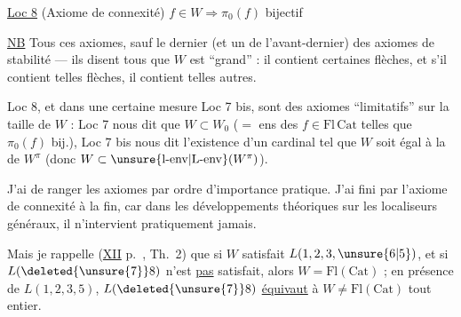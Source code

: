 

\uline{Loc 8} (Axiome de connexité) $f\in W\Rightarrow\pi_0(f)$ bijectif

\uline{NB} Tous ces axiomes, sauf le dernier (et un  de l'avant-dernier)  des axiomes de stabilité --- ils disent tous que $W$ est ``grand'' : il contient certaines flèches, et s'il contient telles flèches, il contient telles autres.

Loc 8, et dans une certaine mesure Loc 7 bis, sont des axiomes ``limitatifs'' sur la taille de $W$ : Loc 7 nous dit que $W\subset W_0$ ($=$ ens des $f\in\mathrm{Fl}\,\mathrm{Cat}$ telles que $\pi_0(f)$ bij.), Loc 7 bis nous dit l'existence d'un cardinal tel que $W$ soit égal à la  de $W^\pi$ (donc $W\subset\unsure{\mathrm{l}\text{-}\mathrm{env}|\mathrm{L}\text{-}\mathrm{env}}(W^\pi)$).

J'ai  de ranger les axiomes par ordre d'importance pratique. J'ai fini par  l'axiome de connexité à la fin, car dans les développements théoriques sur les localiseurs généraux, il n'intervient pratiquement jamais.

Mais je rappelle (\uline{XII} p.~, Th.~2) que si $W$ satisfait $L(1,2,3,\unsure{6|5})$, et si $L(\deleted{\unsure{7}}8)$ n'est \uline{pas} satisfait,  alors $W=\mathrm{Fl}(\mathrm{Cat})$ ;  en présence de $L(1,2,3,5)$, $L(\deleted{\unsure{7}}8)$ \uline{équivaut} à $W\ne\mathrm{Fl}(\mathrm{Cat})$ tout entier.
